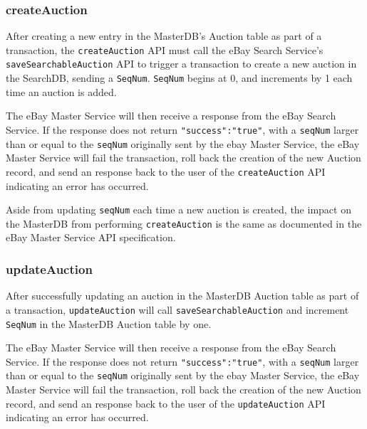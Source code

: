 \documentclass[12pt,a4paper]{article}
\begin{document}
\subsubsection{createAuction}
After creating a new entry in the MasterDB's Auction table as part of a transaction, 
the \texttt{createAuction} API must call the eBay Search Service's 
\texttt{saveSearchableAuction} API to trigger a transaction to create 
a new auction in the SearchDB, sending a \texttt{SeqNum}.
\texttt{SeqNum} begins at 0, and increments by 1 each time an auction is added.

\vspace{\baselineskip}
The eBay Master Service will then receive a response from the eBay Search Service. 
If the response does not return \texttt{"success":"true"}, with a \texttt{seqNum}
larger than or equal to the \texttt{seqNum} originally sent by the ebay Master Service, 
the eBay Master Service will fail the transaction, roll back the creation of the new Auction record, 
and send an response back to the user of the \texttt{createAuction} API 
indicating an error has occurred.


\vspace{\baselineskip}
Aside from updating \texttt{seqNum} each time a new auction is created, the 
impact on the MasterDB from performing \texttt{createAuction} is the same as 
documented in the eBay Master Service API specification.


\subsubsection{updateAuction}

After successfully updating an auction in the MasterDB Auction table as part of a transaction, 
 \texttt{updateAuction} will call \texttt{saveSearchableAuction} and increment \texttt{SeqNum} 
 in the MasterDB Auction table by one.

 \vspace{\baselineskip} 

The eBay Master Service will then receive a response from the eBay Search Service.
If the response does not return \texttt{"success":"true"}, with a \texttt{seqNum}
larger than or equal to the \texttt{seqNum} originally sent by the ebay Master Service, 
the eBay Master Service will fail the transaction, roll back the creation of the new Auction record, 
and send an response back to the user of the \texttt{updateAuction} API 
indicating an error has occurred.
\end{document}
